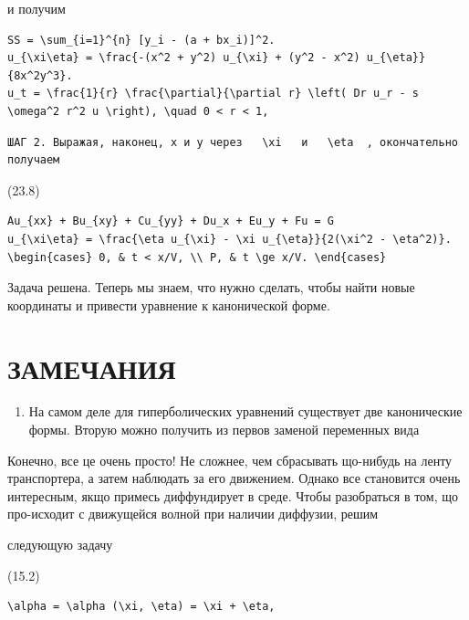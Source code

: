\documentclass[
  ukrainian,
]{article}
\providecommand{\tightlist}{%
  \setlength{\itemsep}{0pt}\setlength{\parskip}{0pt}}
\begin{document}
и получим

\begin{verbatim}
SS = \sum_{i=1}^{n} [y_i - (a + bx_i)]^2.
u_{\xi\eta} = \frac{-(x^2 + y^2) u_{\xi} + (y^2 - x^2) u_{\eta}}{8x^2y^3}.
u_t = \frac{1}{r} \frac{\partial}{\partial r} \left( Dr u_r - s \omega^2 r^2 u \right), \quad 0 < r < 1,
\end{verbatim}

\begin{verbatim}
ШАГ 2. Выражая, наконец, x и y через   \xi   и   \eta  , окончательно получаем
\end{verbatim}

(23.8)

\begin{verbatim}
Au_{xx} + Bu_{xy} + Cu_{yy} + Du_x + Eu_y + Fu = G
u_{\xi\eta} = \frac{\eta u_{\xi} - \xi u_{\eta}}{2(\xi^2 - \eta^2)}.
\begin{cases} 0, & t < x/V, \\ P, & t \ge x/V. \end{cases}
\end{verbatim}

Задача решена. Теперь мы знаем, что нужно сделать, чтобы найти новые
координаты и привести уравнение к канонической форме.

\section{ЗАМЕЧАНИЯ}\label{ux437ux430ux43cux435ux447ux430ux43dux438ux44f-3}

\begin{enumerate}
\def\labelenumi{\arabic{enumi}.}
\tightlist
\item
  На самом деле для гиперболических уравнений существует две
  канонические формы. Вторую можно получить из первов заменой переменных
  вида
\end{enumerate}

Конечно, все це очень просто! Не сложнее, чем сбрасывать що-нибудь на
ленту транспортера, а затем наблюдать за его движением. Однако все
становится очень интересным, якщо примесь диффундирует в среде. Чтобы
разобраться в том, що про-исходит с движущейся волной при наличии
диффузии, решим

следующую задачу

(15.2)

\begin{verbatim}
\alpha = \alpha (\xi, \eta) = \xi + \eta,
\end{verbatim}
\end{document}
